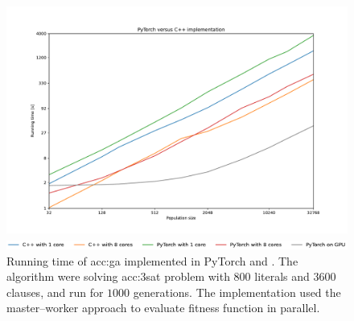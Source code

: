 \begin{figure}[ht!]
    \centering
    \begin{minipage}[t]{0.9\textwidth}
        \includegraphics[width=\textwidth]{img/runs/time_ga_c.pdf}
    \end{minipage}

    \begin{minipage}[t]{0.9\textwidth}
        \includegraphics[width=\textwidth]{img/runs/time_ga_c_legend.pdf}
    \end{minipage}

    \caption[Comparison of PyTorch and \cpp implementation]{Running time of \acrlong{acc:ga} implemented in PyTorch and \cppns. The algorithm were solving \acrshort{acc:3sat} problem with $800$ literals and $3600$ clauses, and run for $1000$ generations. The \cpp implementation used the master--worker approach to evaluate fitness function in parallel.}
    \label{meas:cimpl}
\end{figure}




